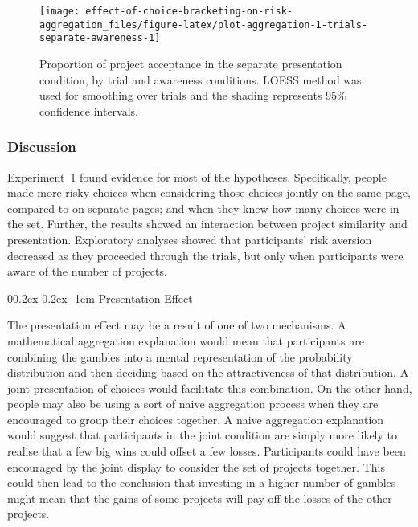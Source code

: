 \documentclass[
  english,
  man, donotrepeattitle,floatsintext]{apa7}
\makeatletter
\let\oldparagraph\paragraph
\renewcommand{\paragraph}[1]{\oldparagraph{#1}\mbox{}}
\renewcommand{\paragraph}{\@startsection{paragraph}{4}{\parindent}%
  {0\baselineskip \@plus 0.2ex \@minus 0.2ex}%
  {-1em}%
  {\normalfont\normalsize\bfseries\itshape\typesectitle}}
\theoremstyle{definition}
\theoremstyle{definition}
\theoremstyle{definition}
\theoremstyle{definition}
\theoremstyle{remark}
\makeatother
\begin{document}
\begin{figure}
\texttt{[image: effect-of-choice-bracketing-on-risk-aggregation\_files/figure-latex/plot-aggregation-1-trials-separate-awareness-1]} \caption{Proportion of project acceptance in the separate presentation condition, by trial and awareness conditions. LOESS method was used for smoothing over trials and the shading represents 95\% confidence intervals.}\label{fig:plot-aggregation-1-trials-separate-awareness}
\end{figure}

\hypertarget{discussion-aggregation-1}{%
\subsubsection{Discussion}\label{discussion-aggregation-1}}

Experiment~1 found evidence for most of the hypotheses. Specifically, people
made more risky choices when considering those choices jointly on the same page,
compared to on separate pages; and when they knew how many choices were in the
set. Further, the results showed an interaction between project similarity and
presentation. Exploratory analyses showed that participants' risk aversion
decreased as they proceeded through the trials, but only when participants were
aware of the number of projects.

\hypertarget{presentation-effect}{%
\paragraph{Presentation Effect}\label{presentation-effect}}

The presentation effect may be a result of one of two mechanisms. A mathematical
aggregation explanation would mean that participants are combining the gambles
into a mental representation of the probability distribution and then deciding
based on the attractiveness of that distribution. A joint presentation of
choices would facilitate this combination. On the other hand, people may also be
using a sort of naive aggregation process when they are encouraged to group
their choices together. A naive aggregation explanation would suggest that
participants in the joint condition are simply more likely to realise that a few
big wins could offset a few losses. Participants could have been encouraged by
the joint display to consider the set of projects together. This could then lead
to the conclusion that investing in a higher number of gambles might mean that
the gains of some projects will pay off the losses of the other projects.
\end{document}
